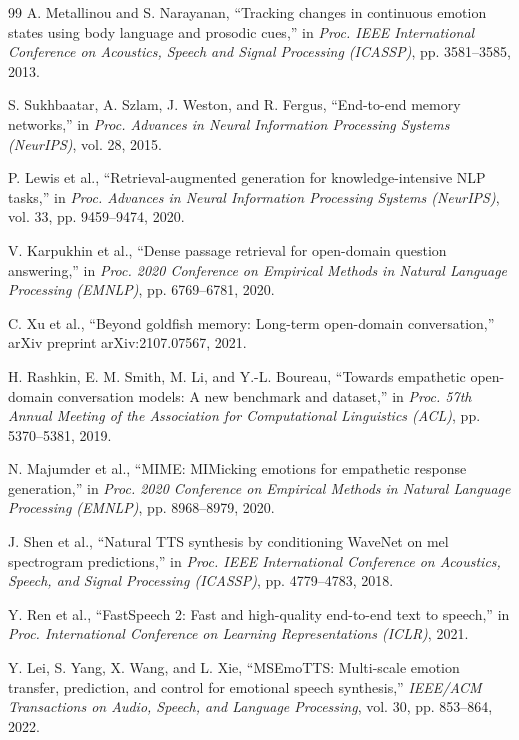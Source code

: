 \documentclass[conference]{IEEEtran}
\begin{document}
\begin{thebibliography}{99}
A. Metallinou and S. Narayanan, ``Tracking changes in continuous emotion states using body language and prosodic cues,'' in \textit{Proc. IEEE International Conference on Acoustics, Speech and Signal Processing (ICASSP)}, pp. 3581--3585, 2013.

S. Sukhbaatar, A. Szlam, J. Weston, and R. Fergus, ``End-to-end memory networks,'' in \textit{Proc. Advances in Neural Information Processing Systems (NeurIPS)}, vol. 28, 2015.

P. Lewis et al., ``Retrieval-augmented generation for knowledge-intensive NLP tasks,'' in \textit{Proc. Advances in Neural Information Processing Systems (NeurIPS)}, vol. 33, pp. 9459--9474, 2020.

V. Karpukhin et al., ``Dense passage retrieval for open-domain question answering,'' in \textit{Proc. 2020 Conference on Empirical Methods in Natural Language Processing (EMNLP)}, pp. 6769--6781, 2020.

C. Xu et al., ``Beyond goldfish memory: Long-term open-domain conversation,'' arXiv preprint arXiv:2107.07567, 2021.

H. Rashkin, E. M. Smith, M. Li, and Y.-L. Boureau, ``Towards empathetic open-domain conversation models: A new benchmark and dataset,'' in \textit{Proc. 57th Annual Meeting of the Association for Computational Linguistics (ACL)}, pp. 5370--5381, 2019.

N. Majumder et al., ``MIME: MIMicking emotions for empathetic response generation,'' in \textit{Proc. 2020 Conference on Empirical Methods in Natural Language Processing (EMNLP)}, pp. 8968--8979, 2020.

J. Shen et al., ``Natural TTS synthesis by conditioning WaveNet on mel spectrogram predictions,'' in \textit{Proc. IEEE International Conference on Acoustics, Speech, and Signal Processing (ICASSP)}, pp. 4779--4783, 2018.

Y. Ren et al., ``FastSpeech 2: Fast and high-quality end-to-end text to speech,'' in \textit{Proc. International Conference on Learning Representations (ICLR)}, 2021.

Y. Lei, S. Yang, X. Wang, and L. Xie, ``MSEmoTTS: Multi-scale emotion transfer, prediction, and control for emotional speech synthesis,'' \textit{IEEE/ACM Transactions on Audio, Speech, and Language Processing}, vol. 30, pp. 853--864, 2022.

\end{thebibliography}
\end{document}
